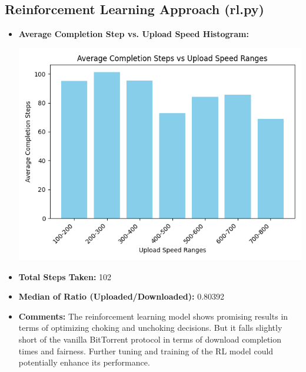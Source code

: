 \documentclass{article}
\begin{document}
\subsection{Reinforcement Learning Approach (rl.py)}
\begin{itemize}
\item \textbf{Average Completion Step vs. Upload Speed Histogram:} 

\includegraphics[width=\linewidth]{graphs/rl.png}
\item \textbf{Total Steps Taken:} 102
\item \textbf{Median of Ratio (Uploaded/Downloaded):} 0.80392
\item \textbf{Comments:} The reinforcement learning model shows promising results in terms of optimizing choking and unchoking decisions. But it falls slightly short of the vanilla BitTorrent protocol in terms of download completion times and fairness. Further tuning and training of the RL model could potentially enhance its performance.
\end{itemize}

\newpage
\end{document}
